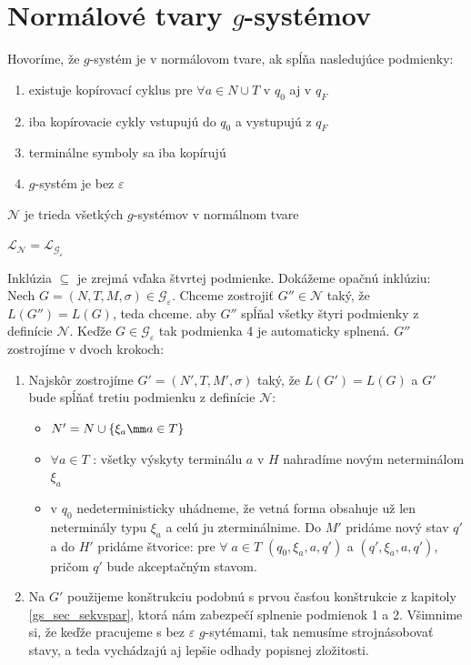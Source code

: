 \section{Normálové tvary $g$-systémov}

\begin{definicia}
Hovoríme, že $g$-systém je v normálovom tvare, ak spĺňa
nasledujúce podmienky:
\begin{enumerate}
\item existuje kopírovací cyklus pre $\forall a\in N\cup T$ v $q_0$ aj v $q_F$
\item iba kopírovacie cykly vstupujú do $q_0$ a vystupujú z $q_F$
\item terminálne symboly sa iba kopírujú
\item $g$-systém je bez $\varepsilon$
\end{enumerate}
\end{definicia}

\begin{oznacenie}
$\mathcal{N}$ je trieda všetkých $g$-systémov v normálnom tvare
\end{oznacenie}

\begin{veta}
$\mathcal{L}_{\mathcal{N}}=\mathcal{L}_{\mathcal{G}_{\varepsilon}}$
\end{veta}

\begin{dokaz}
Inklúzia $\subseteq$ je zrejmá vďaka štvrtej podmienke. Dokážeme
opačnú inklúziu: \\ Nech
$G=(N,T,M,\sigma)\in\mathcal{G}_\varepsilon$. Chceme zostrojiť
$G''\in\mathcal{N}$ taký, že $L(G'')=L(G)$, teda chceme. aby $G''$
spĺňal všetky štyri podmienky z definície $\mathcal{N}$. Keďže
$G\in\mathcal{G}_\varepsilon$ tak podmienka 4 je automaticky
splnená. $G''$ zostrojíme v dvoch krokoch:
\begin{enumerate}
  \item Najskôr zostrojíme $G'=(N',T,M',\sigma)$ taký, že $L(G')=L(G)$ a $G'$ bude
  spĺňať tretiu podmienku z definície $\mathcal{N}$:
  \begin{itemize}
    \item $N'=N\cup\{\xi_a\mm a\in T\}$
    \item $\forall a\in T$ : všetky výskyty
    terminálu $a$ v $H$ nahradíme novým neterminálom $\xi_a$
    \item v $q_0$ nedeterministicky uhádneme, že vetná forma
    obsahuje už len neterminály typu $\xi_a$ a celú ju
    zterminálnime. Do $M'$ pridáme nový stav $q'$ a do $H'$
    pridáme štvorice: pre $\forall\; a\in T$ $(q_0,\xi_a,a,q')$
    a $(q',\xi_a,a,q')$, pričom $q'$ bude akceptačným stavom.
  \end{itemize}
  \item Na $G'$ použijeme konštrukciu podobnú s prvou časťou
  konštrukcie z kapitoly \ref{gs_sec_sekvspar}, ktorá nám zabezpečí
  splnenie podmienok 1 a 2. Všimnime si, že keďže pracujeme s bez
  $\varepsilon$ $g$-sytémami, tak nemusíme strojnásobovať stavy, a
  teda vychádzajú aj lepšie odhady popisnej zložitosti.
\end{enumerate}
\end{dokaz}

